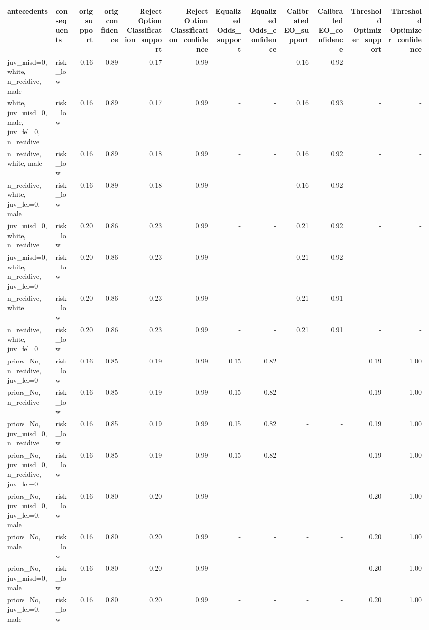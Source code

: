 \begin{tabular}{llrrrrrrrrrr}
\toprule
antecedents & consequents & orig\_support & orig\_confidence & Reject Option Classification\_support & Reject Option Classification\_confidence & Equalized Odds\_support & Equalized Odds\_confidence & Calibrated EO\_support & Calibrated EO\_confidence & Threshold Optimizer\_support & Threshold Optimizer\_confidence \\
\midrule
juv\_misd=0, white, n\_recidive, male & risk\_low & 0.16 & 0.89 & 0.17 & 0.99 & - & - & 0.16 & 0.92 & - & - \\
white, juv\_misd=0, male, juv\_fel=0, n\_recidive & risk\_low & 0.16 & 0.89 & 0.17 & 0.99 & - & - & 0.16 & 0.93 & - & - \\
n\_recidive, white, male & risk\_low & 0.16 & 0.89 & 0.18 & 0.99 & - & - & 0.16 & 0.92 & - & - \\
n\_recidive, white, juv\_fel=0, male & risk\_low & 0.16 & 0.89 & 0.18 & 0.99 & - & - & 0.16 & 0.92 & - & - \\
juv\_misd=0, white, n\_recidive & risk\_low & 0.20 & 0.86 & 0.23 & 0.99 & - & - & 0.21 & 0.92 & - & - \\
juv\_misd=0, white, n\_recidive, juv\_fel=0 & risk\_low & 0.20 & 0.86 & 0.23 & 0.99 & - & - & 0.21 & 0.92 & - & - \\
n\_recidive, white & risk\_low & 0.20 & 0.86 & 0.23 & 0.99 & - & - & 0.21 & 0.91 & - & - \\
n\_recidive, white, juv\_fel=0 & risk\_low & 0.20 & 0.86 & 0.23 & 0.99 & - & - & 0.21 & 0.91 & - & - \\
priors\_No, n\_recidive, juv\_fel=0 & risk\_low & 0.16 & 0.85 & 0.19 & 0.99 & 0.15 & 0.82 & - & - & 0.19 & 1.00 \\
priors\_No, n\_recidive & risk\_low & 0.16 & 0.85 & 0.19 & 0.99 & 0.15 & 0.82 & - & - & 0.19 & 1.00 \\
priors\_No, juv\_misd=0, n\_recidive & risk\_low & 0.16 & 0.85 & 0.19 & 0.99 & 0.15 & 0.82 & - & - & 0.19 & 1.00 \\
priors\_No, juv\_misd=0, n\_recidive, juv\_fel=0 & risk\_low & 0.16 & 0.85 & 0.19 & 0.99 & 0.15 & 0.82 & - & - & 0.19 & 1.00 \\
priors\_No, juv\_misd=0, juv\_fel=0, male & risk\_low & 0.16 & 0.80 & 0.20 & 0.99 & - & - & - & - & 0.20 & 1.00 \\
priors\_No, male & risk\_low & 0.16 & 0.80 & 0.20 & 0.99 & - & - & - & - & 0.20 & 1.00 \\
priors\_No, juv\_misd=0, male & risk\_low & 0.16 & 0.80 & 0.20 & 0.99 & - & - & - & - & 0.20 & 1.00 \\
priors\_No, juv\_fel=0, male & risk\_low & 0.16 & 0.80 & 0.20 & 0.99 & - & - & - & - & 0.20 & 1.00 \\
\bottomrule
\end{tabular}
